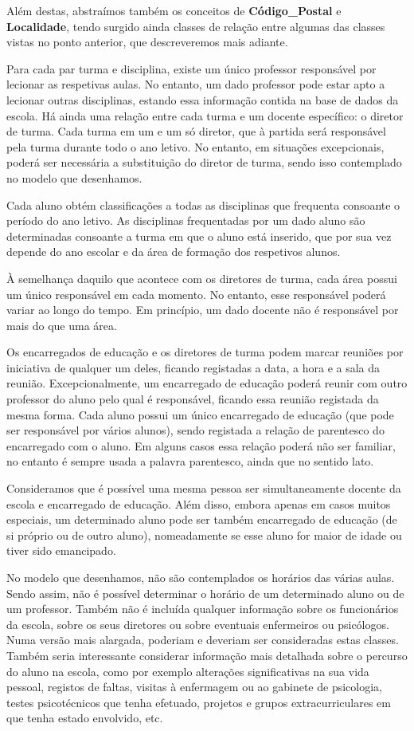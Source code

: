 \documentclass[12pt,a4paper,reqno]{report}
\numberwithin{figure}{section}
\numberwithin{equation}{section}
\begin{document}
Além destas, abstraímos também os conceitos de \textbf{Código\_Postal} e \textbf{Localidade}, tendo surgido ainda classes de relação entre algumas das classes vistas no ponto anterior, que descreveremos mais adiante.

Para cada par turma e disciplina, existe um único professor responsável por lecionar as respetivas aulas. No entanto, um dado professor pode estar apto a lecionar outras disciplinas, estando essa informação contida na base de dados da escola. Há ainda uma relação entre cada turma e um docente específico: o diretor de turma. Cada turma em um e um só diretor, que à partida será responsável pela turma durante todo o ano letivo. No entanto, em situações excepcionais, poderá ser necessária a substituição do diretor de turma, sendo isso contemplado no modelo que desenhamos.

Cada aluno obtém classificações a todas as disciplinas que frequenta consoante o período do ano letivo. As disciplinas frequentadas por um dado aluno são determinadas consoante a turma em que o aluno está inserido, que por sua vez depende do ano escolar e da área de formação dos respetivos alunos.

À semelhança daquilo que acontece com os diretores de turma, cada área possui um único responsável em cada momento. No entanto, esse responsável poderá variar ao longo do tempo. Em princípio, um dado docente não é responsável por mais do que uma área.

Os encarregados de educação e os diretores de turma podem marcar reuniões por iniciativa de qualquer um deles, ficando registadas a data, a hora e a sala da reunião. Excepcionalmente, um encarregado de educação poderá reunir com outro professor do aluno pelo qual é responsável, ficando essa reunião registada da mesma forma. Cada aluno possui um único encarregado de educação (que pode ser responsável por vários alunos), sendo registada a relação de parentesco do encarregado com o aluno. Em alguns casos essa relação poderá não ser familiar, no entanto é sempre usada a palavra parentesco, ainda que no sentido lato.

Consideramos que é possível uma mesma pessoa ser simultaneamente docente da escola e encarregado de educação. Além disso, embora apenas em casos muitos especiais, um determinado aluno pode ser também encarregado de educação (de si próprio ou de outro aluno), nomeadamente se esse aluno for maior de idade ou tiver sido emancipado.

No modelo que desenhamos, não são contemplados os horários das várias aulas. Sendo assim, não é possível determinar o horário de um determinado aluno ou de um professor. Também não é incluída qualquer informação sobre os funcionários da escola, sobre os seus diretores ou sobre eventuais enfermeiros ou psicólogos. Numa versão mais alargada, poderiam e deveriam ser consideradas estas classes. Também seria interessante considerar informação mais detalhada sobre o percurso do aluno na escola, como por exemplo alterações significativas na sua vida pessoal, registos de faltas, visitas à enfermagem ou ao gabinete de psicologia, testes psicotécnicos que tenha efetuado, projetos e grupos extracurriculares em que tenha estado envolvido, etc.
\end{document}
